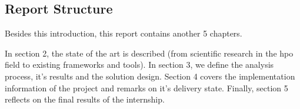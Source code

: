 
\subsection{Report Structure}

Besides this introduction, this report contains another 5 chapters.

In section 2, the state of the art is described (from scientific research in the \acrshort{hpo} field to existing frameworks and tools). In section 3, we define the analysis process, it's results and the solution design. Section 4 covers the implementation information of the project and remarks on it's delivery state. Finally, section 5 reflects on the final results of the internship.